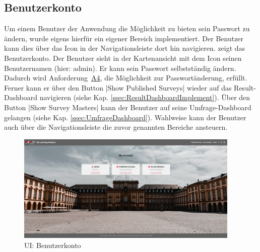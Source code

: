 
\subsection{Benutzerkonto}
\label{ssec:Benutzerkonto}

Um einem Benutzer der Anwendung die Möglichkeit zu bieten sein Passwort zu ändern, wurde eigens hierfür ein eigener Bereich implementiert.
Der Benutzer kann dies über das Icon \faUser[regular]\xspace in der Navigationsleiste dort hin navigieren.
\abb {} zeigt das Benutzerkonto. \newline
Der Benutzer sieht in der Kartenansicht mit dem Icon \faUser[regular]\xspace seinen Benutzernamen (hier: admin).
Er kann sein Passwort selbstständig ändern.
Dadurch wird Anforderung~\hyperref[Anf:A4]{A4}, die Möglichkeit zur Passwortänderung, erfüllt.\newline
Ferner kann er über den Button \jinline|Show Published Surveys| wieder auf das Result-Dashboard navigieren (siehe Kap. \vref{ssec:ResultDashboardImplement}).
Über den Button \jinline|Show Survey Masters| kann der Benutzer auf seine Umfrage-Dashboard gelangen (siehe Kap. \vref{ssec:UmfrageDashboard}).
Wahlweise kann der Benutzer auch über die Navigationsleiste die zuvor genannten Bereiche ansteuern.

\begin{figure}[hp]
	\centering
	\includegraphics[width=0.95\textwidth, keepaspectratio]{img/client/Account.png}
	\captionsetup{justification=centering, format=plain}
	\caption[\acf{UI}: Benutzerkonto]{\acf{UI}: Benutzerkonto \\ \quelleScreenshot}
	\label{fig:AccountImplement}
\end{figure}


